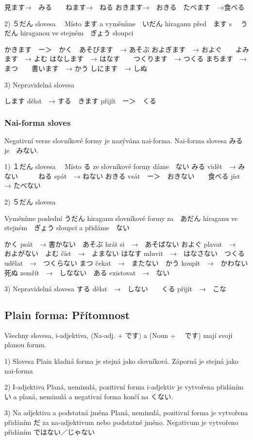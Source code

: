 見ます→　みる　　ねます→　ねる
おきます→　おきる　たべます　→食べる

2) ５だん slovesa　
Místo ます a vyměníme　いだん hiraganu před　ます s 　うだん hiraganou ve stejném　ぎょう sloupci

かきます　ー＞　かく　あそびます　→ あそぶ
およぎます　→ およぐ　　よみます　→ よむ
はなします　→ はなす　　つくります　→ つくる
まちます　→ まつ　　書います　→ かう
しにます　→ しぬ

3) Nepravidelná slovesa

します dělat　→ する　きます přijít　ー＞　くる

\subsubsection{Nai-forma sloves}
Negativní verze slovníkové formy je nazývána nai-forma. Nai-forma slovesa みる je　みない.

1) １だん slovesa　
Místo る ze slovníkové formy dáme　ない
みる vidět　→ みない　　　ねる spát　→ ねない
おきる vsát　ー＞　おきない　　食べる jíst　→ たべない

2) ５だん slovesa

Vyměníme poslední うだん hiraganu slovníkové formy za　あだん hiraganu ve stejném　ぎょう sloupci a přidáme　ない

かく psát　→ 書かない　あそぶ hrát si　→　あそばない
およぐ plavat　→　およがない　よむ číst　→　よまない
はなす mluvit　→　はなさない　つくる udělat　→　つくらない
まつ čekat　→　またない　かう koupit　→　かわない
死ぬ zemřít　→　しなない　ある existovat　→　ない


3) Nepravidelná slovesa
する dělat　→　しない　　くる přijít　→　こな


\subsection{Plain forma: Přítomnost}

Všechny slovesa, i-adjektiva, (Na-adj. + です) a (Noun + 　です) mají svojí planou formu. 

1) Slovesa
Plain kladná forma je stejná jako slovníková. Záporná je stejná jako nai-forma

2) I-adjektiva
Planá, neminulá, pozitivní forma i-adjektiv je vytvořena přidáním い a planá, neminulá a negativní forma končí na くない.

3) Na adjektiva a podstatná jména
Planá, neminulá, pozitivní forma je vytvořena přidáním だ za na-adjektivum nebo podstatné jméno. Negativum je vytvořeno přidáním ではない／じゃない


